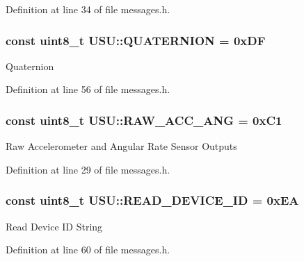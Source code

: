 \-Definition at line 34 of file messages.\-h.

\hypertarget{namespace_u_s_u_ad476e2e7f70dbe869e508f676bea92a9}{
\subsubsection[{\-Q\-U\-A\-T\-E\-R\-N\-I\-O\-N}]{\setlength{\rightskip}{0pt plus 5cm}const uint8\-\_\-t {\bf \-U\-S\-U\-::\-Q\-U\-A\-T\-E\-R\-N\-I\-O\-N} = 0x\-D\-F}}\label{namespace_u_s_u_ad476e2e7f70dbe869e508f676bea92a9}
\-Quaternion 

\-Definition at line 56 of file messages.\-h.

\hypertarget{namespace_u_s_u_a6bbb473161195a7e10d9f821cece1b04}{
\subsubsection[{\-R\-A\-W\-\_\-\-A\-C\-C\-\_\-\-A\-N\-G}]{\setlength{\rightskip}{0pt plus 5cm}const uint8\-\_\-t {\bf \-U\-S\-U\-::\-R\-A\-W\-\_\-\-A\-C\-C\-\_\-\-A\-N\-G} = 0x\-C1}}\label{namespace_u_s_u_a6bbb473161195a7e10d9f821cece1b04}
\-Raw \-Accelerometer and \-Angular \-Rate \-Sensor \-Outputs 

\-Definition at line 29 of file messages.\-h.

\hypertarget{namespace_u_s_u_ad810b0281ab629302e9fd716374b90ed}{
\subsubsection[{\-R\-E\-A\-D\-\_\-\-D\-E\-V\-I\-C\-E\-\_\-\-I\-D}]{\setlength{\rightskip}{0pt plus 5cm}const uint8\-\_\-t {\bf \-U\-S\-U\-::\-R\-E\-A\-D\-\_\-\-D\-E\-V\-I\-C\-E\-\_\-\-I\-D} = 0x\-E\-A}}\label{namespace_u_s_u_ad810b0281ab629302e9fd716374b90ed}
\-Read \-Device \-I\-D \-String 

\-Definition at line 60 of file messages.\-h.

